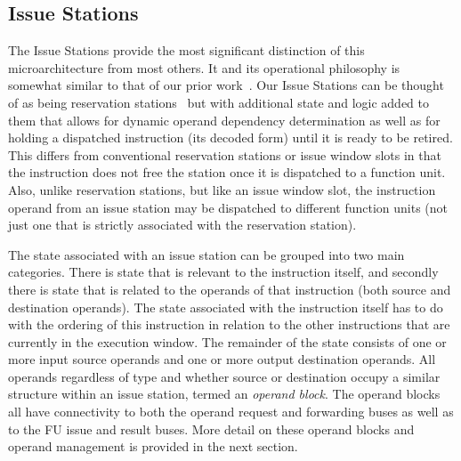 \documentclass[10pt,dvips]{article}
\begin{document}
\subsection{Issue Stations}
%
The Issue Stations provide the most significant distinction of this
microarchitecture from most others.  It and its operational philosophy
is somewhat similar to that of our prior work~\cite{undisclosed1}.
Our Issue Stations can be thought of as being 
reservation stations~\cite{Tom67} but
with additional state and logic added to them that allows
for dynamic operand dependency determination as well as
for holding a dispatched instruction (its decoded form) 
until it is ready to be
retired.  This differs from conventional reservation stations
or issue window slots in that the instruction does not free
the station once it is dispatched to a function unit.
Also, unlike reservation stations, but like an issue window slot,
the instruction operand from an issue station may be dispatched
to different function units (not just one that is strictly
associated with the reservation station).

The state associated with an issue station can be grouped into
two main categories.  There is state that is relevant to
the instruction itself, and secondly there is state that is
related to the operands of that instruction (both source and
destination operands).
The state associated with the instruction itself has to do
with the ordering of this instruction in relation to the other
instructions that are currently in the execution window.
The remainder of the state consists of one or more input
source operands and one or more output destination operands.
All operands regardless of type and whether source or destination
occupy a similar structure within an issue station, termed an
\textit{operand block}.
The operand blocks all have connectivity to both the
operand request and forwarding buses as well as to the FU
issue and result buses.
More detail on these operand blocks and operand management
is provided in the next section.
\end{document}
